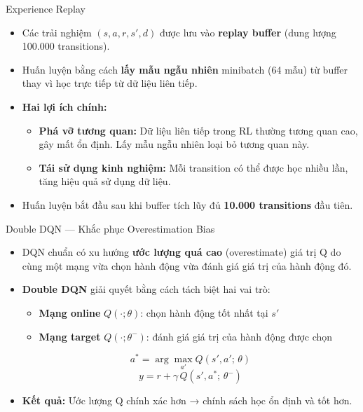 \begin{frame}{Experience Replay}
\begin{itemize}
    \item Các trải nghiệm $(s, a, r, s', d)$ được lưu vào \textbf{replay buffer} (dung lượng 100.000 transitions).
    \item Huấn luyện bằng cách \textbf{lấy mẫu ngẫu nhiên} minibatch (64 mẫu) từ buffer thay vì học trực tiếp từ dữ liệu liên tiếp.
    \item \textbf{Hai lợi ích chính:}
    \begin{itemize}
        \item \textbf{Phá vỡ tương quan:} Dữ liệu liên tiếp trong RL thường tương quan cao, gây mất ổn định. Lấy mẫu ngẫu nhiên loại bỏ tương quan này.
        \item \textbf{Tái sử dụng kinh nghiệm:} Mỗi transition có thể được học nhiều lần, tăng hiệu quả sử dụng dữ liệu.
    \end{itemize}
    \item Huấn luyện bắt đầu sau khi buffer tích lũy đủ \textbf{10.000 transitions} đầu tiên.
\end{itemize}
\end{frame}

\begin{frame}{Double DQN — Khắc phục Overestimation Bias}
\begin{itemize}
    \item DQN chuẩn có xu hướng \textbf{ước lượng quá cao} (overestimate) giá trị Q do cùng một mạng vừa chọn hành động vừa đánh giá giá trị của hành động đó.
    \item \textbf{Double DQN} giải quyết bằng cách tách biệt hai vai trò:
    \begin{itemize}
        \item \textbf{Mạng online} $Q(\cdot;\theta)$: chọn hành động tốt nhất tại $s'$
        \item \textbf{Mạng target} $Q(\cdot;\theta^-)$: đánh giá giá trị của hành động được chọn
    \end{itemize}
    \[
    a^* = \arg\max_{a'} Q(s', a';\, \theta)
    \]
    \[
    y = r + \gamma\, Q(s', a^*;\, \theta^-)
    \]
    \item \textbf{Kết quả:} Ước lượng Q chính xác hơn → chính sách học ổn định và tốt hơn.
\end{itemize}
\end{frame}

